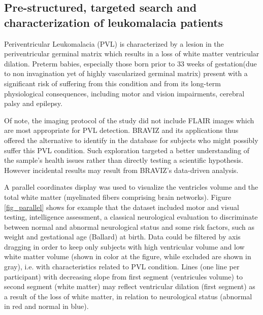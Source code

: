 \documentclass{frontiersHLTH}
\begin{document}
\subsection{Pre-structured, targeted search and characterization of leukomalacia patients}
\label{sec_pvm_case}

Periventricular Leukomalacia (PVL) is characterized by a lesion in the periventricular germinal matrix which results in a loss of white matter ventricular dilation. Preterm babies, especially those born prior to 33 weeks of gestation(due to non invagination yet of highly vascularized germinal matrix) present with a significant risk of suffering from this condition and from its long-term physiological consequences, including motor and vision impairments, cerebral palsy and epilepsy.

Of note, the imaging protocol of the study did not include FLAIR images which are most appropriate for  PVL detection. BRAVIZ and its applications thus offered the alternative to identify in the database for subjects who might possibly suffer this PVL condition. Such exploration targeted a better understanding of the sample’s health issues rather than directly testing a scientific hypothesis. However incidental results may result from BRAVIZ’s data-driven analysis.

A parallel coordinates display was used to visualize the ventricles volume and the total white matter (myelinated fibers comprising brain networks). Figure \ref{fig_parallel} shows for example that the dataset included motor and visual testing, intelligence assessment, a classical neurological evaluation to discriminate between  normal and abnormal neurological status and some risk factors, such as weight and gestational age (Ballard) at birth. Data could be filtered by axis dragging in order to keep only subjects with high ventricular volume and low white matter volume (shown in color at the figure, while excluded are shown in gray), i.e. with characteristics related to PVL condition. Lines (one line per participant) with decreasing slope from first segment (ventricules volume) to second segment (white matter) may reflect ventricular dilation (first segment) as a result of the loss of white matter, in relation to neurological status (abnormal in red and normal in blue). 
\end{document}
